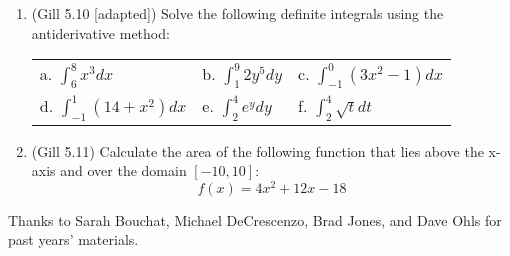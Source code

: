 \documentclass[11pt]{article}
\begin{document}
\begin{enumerate}
\vspace{.5cm}

\item (Gill 5.10 [adapted]) Solve the following definite integrals using the antiderivative method:
\begin{center}
\begin{tabular}{p{4cm}p{4cm}p{4cm}}
a. $\int_{6}^{8} x^3 dx$            &  b. $\int_{1}^{9} 2y^5 dy$       & c. $\int_{-1}^{0} (3x^2 - 1)dx$                     \rule{0cm}{1cm}\\
d. $\int_{-1}^{1} (14 + x^2) dx$    &  e. $\int_{2}^{4} e^y dy$        & f. $\int_{2}^{4} \sqrt{t}dt$
\rule{0cm}{1cm}\\
\end{tabular}
\end{center}

\vspace{.5cm}

\item (Gill 5.11) Calculate the area of the following function that lies above the x-axis and over the domain $[-10,10]$:
\begin{equation*}
f(x) = 4x^2 + 12x - 18
\end{equation*}

\vspace{.5cm}

\end{enumerate}


\vfill
\begin{center}
\small{Thanks to Sarah Bouchat, Michael DeCrescenzo, Brad Jones, and Dave Ohls for past years' materials.}
\end{center}
\end{document}
